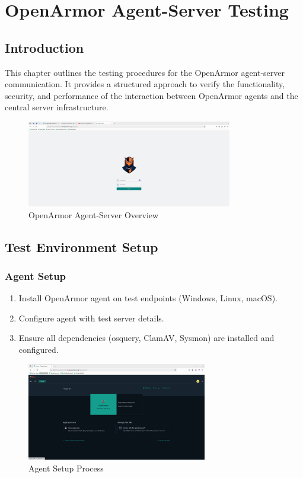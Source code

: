 \chapter{OpenArmor Agent-Server Testing}

\section{Introduction}
This chapter outlines the testing procedures for the OpenArmor agent-server communication. It provides a structured approach to verify the functionality, security, and performance of the interaction between OpenArmor agents and the central server infrastructure.

\begin{figure}[h]
    \centering
    \includegraphics[width=0.8\textwidth]{openarmor-agent/1.png}
    \caption{OpenArmor Agent-Server Overview}
    \label{fig:agent-server-overview}
\end{figure}

\section{Test Environment Setup}
\subsection{Agent Setup}
\begin{enumerate}
    \item Install OpenArmor agent on test endpoints (Windows, Linux, macOS).
    \item Configure agent with test server details.
    \item Ensure all dependencies (osquery, ClamAV, Sysmon) are installed and configured.
\end{enumerate}

\begin{figure}[h]
    \centering
    \includegraphics[width=0.7\textwidth]{openarmor-agent/2.png}
    \caption{Agent Setup Process}
    \label{fig:agent-setup}
\end{figure}

